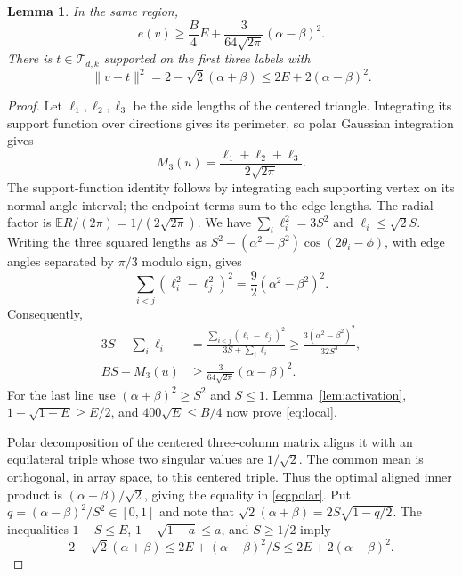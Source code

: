 \documentclass[11pt,reqno]{amsart}
\numberwithin{equation}{section}
\newtheorem{lemma}[theorem]{Lemma}
\theoremstyle{definition}
\theoremstyle{remark}
\newcommand{\E}{\mathbb E}
\newcommand{\cT}{\mathcal T}
\begin{document}
\begin{lemma}\label{lem:triangle}
In the same region,
\begin{equation}\label{eq:local}
 e(v)\ge\frac B4 E+\frac3{64\sqrt{2\pi}}(\alpha-\beta)^2.
\end{equation}
There is $t\in\cT_{d,k}$ supported on the first three labels with
\begin{equation}\label{eq:polar}
 \|v-t\|^2=2-\sqrt2(\alpha+\beta)
                         \le2E+2(\alpha-\beta)^2.
\end{equation}
\end{lemma}
\begin{proof}
Let $\ell_1,\ell_2,\ell_3$ be the side lengths of the centered
triangle. Integrating its support function over directions gives its
perimeter, so polar Gaussian integration gives
\[
              M_3(u)=\frac{\ell_1+\ell_2+\ell_3}{2\sqrt{2\pi}}.
\]
The support-function identity follows by integrating each supporting
vertex on its normal-angle interval; the endpoint terms sum to the
edge lengths. The radial factor is $\E R/(2\pi)=1/(2\sqrt{2\pi})$.
We have $\sum_i\ell_i^2=3S^2$ and $\ell_i\le\sqrt2 S$.
Writing the three squared lengths as
$S^2+(\alpha^2-\beta^2)\cos(2\theta_i-\phi)$, with edge angles
separated by $\pi/3$ modulo sign, gives
\[
 \sum_{i<j}(\ell_i^2-\ell_j^2)^2
                              =\frac92(\alpha^2-\beta^2)^2.
\]
Consequently,
\begin{align*}
 3S-\sum_i\ell_i
 &=\frac{\sum_{i<j}(\ell_i-\ell_j)^2}{3S+\sum_i\ell_i}
   \ge\frac{3(\alpha^2-\beta^2)^2}{32S^3},\\
 BS-M_3(u)&\ge\frac3{64\sqrt{2\pi}}(\alpha-\beta)^2.
\end{align*}
For the last line use $(\alpha+\beta)^2\ge S^2$ and $S\le1$.
Lemma~\ref{lem:activation}, $1-\sqrt{1-E}\ge E/2$, and
$400\sqrt E\le B/4$ now prove \eqref{eq:local}.

Polar decomposition of the centered three-column matrix aligns it
with an equilateral triple whose two singular values are $1/\sqrt2$.
The common mean is orthogonal, in array space, to this centered
triple. Thus the optimal aligned inner product is
$(\alpha+\beta)/\sqrt2$, giving the equality in \eqref{eq:polar}.
Put $q=(\alpha-\beta)^2/S^2\in[0,1]$ and note that
$\sqrt2(\alpha+\beta)=2S\sqrt{1-q/2}$. The inequalities
$1-S\le E$, $1-\sqrt{1-a}\le a$, and $S\ge1/2$ imply
\[
 2-\sqrt2(\alpha+\beta)\le2E+(\alpha-\beta)^2/S
                            \le2E+2(\alpha-\beta)^2.
\]
\end{proof}
\end{document}
